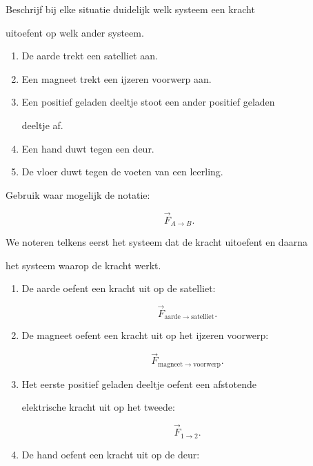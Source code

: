 \documentclass{ximera}
\begin{document}
\begin{oefening}{\oefB\ESS}

Beschrijf bij elke situatie duidelijk welk systeem een kracht

uitoefent op welk ander systeem.

\begin{enumerate}

 \item De aarde trekt een satelliet aan.

 \item Een magneet trekt een ijzeren voorwerp aan.

 \item Een positief geladen deeltje stoot een ander positief geladen

    deeltje af.

 \item Een hand duwt tegen een deur.

 \item De vloer duwt tegen de voeten van een leerling.

\end{enumerate}

Gebruik waar mogelijk de notatie:

\[\vec F_{A\rightarrow B}.\]


\begin{oplossing}

We noteren telkens eerst het systeem dat de kracht uitoefent en daarna

het systeem waarop de kracht werkt.

\begin{enumerate}

  \item De aarde oefent een kracht uit op de satelliet:

  \[\boxed{\vec F_{\mathrm{aarde}\rightarrow\mathrm{satelliet}}}.\]

  \item De magneet oefent een kracht uit op het ijzeren voorwerp:

  \[\boxed{\vec F_{\mathrm{magneet}\rightarrow\mathrm{voorwerp}}}.\]

  \item Het eerste positief geladen deeltje oefent een afstotende

  elektrische kracht uit op het tweede:

  \[\boxed{\vec F_{1\rightarrow2}}.\]

  \item De hand oefent een kracht uit op de deur:


\end{enumerate}
\end{oplossing}
\end{oefening}
\end{document}
